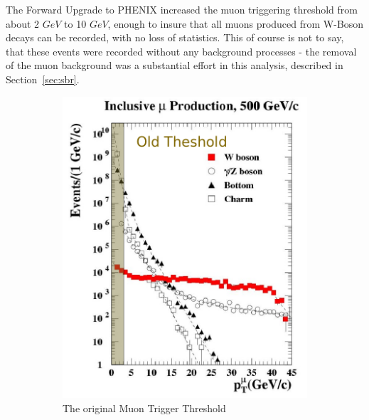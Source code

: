 The Forward Upgrade to PHENIX increased the muon triggering threshold from about
2 $GeV$ to 10 $GeV$, enough to insure that all muons produced from W-Boson
decays can be recorded, with no loss of statistics. This of course is not to
say, that these events were recorded without any background processes - the
removal of the muon background was a substantial effort in this analysis,
described in Section~\ref{sec:sbr}.

\begin{figure}[ht]
  \centering
  \begin{subfigure}[b]{0.5\textwidth}
    \centering
    \includegraphics[width=\textwidth]{./figures/w_old_trigger.png}
    \caption{The original Muon Trigger Threshold}
    \label{fig:trig_muon_old}
  \end{subfigure}%
  ~
  \begin{subfigure}[b]{0.5\textwidth}
    \centering

\end{subfigure}
\end{figure}
